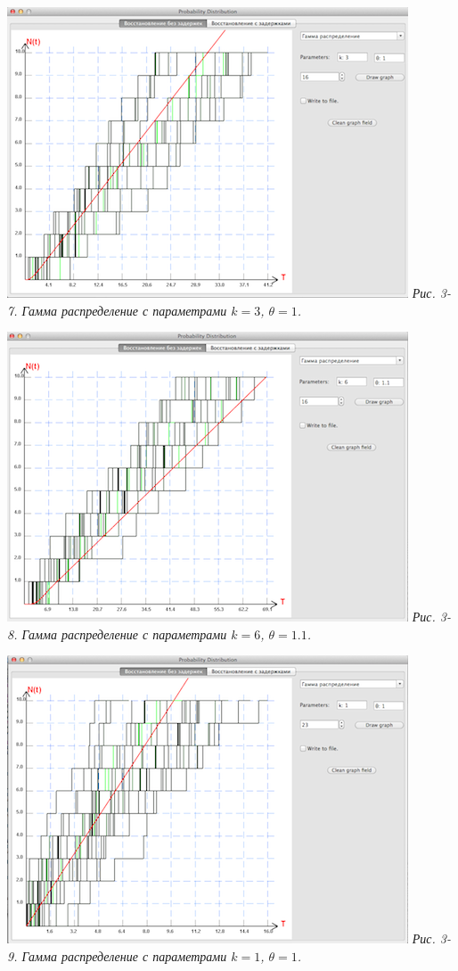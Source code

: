 \includegraphics{3-7.png} 
\textit{Рис. 3-7. Гамма распределение с параметрами $k = 3$, $\theta = 1$.}

\includegraphics{3-8.png} 
\textit{Рис. 3-8. Гамма распределение с параметрами $k = 6$, $\theta = 1.1$.}

\includegraphics{3-9.png} 
\textit{Рис. 3-9. Гамма распределение с параметрами $k = 1$, $\theta = 1$.}

